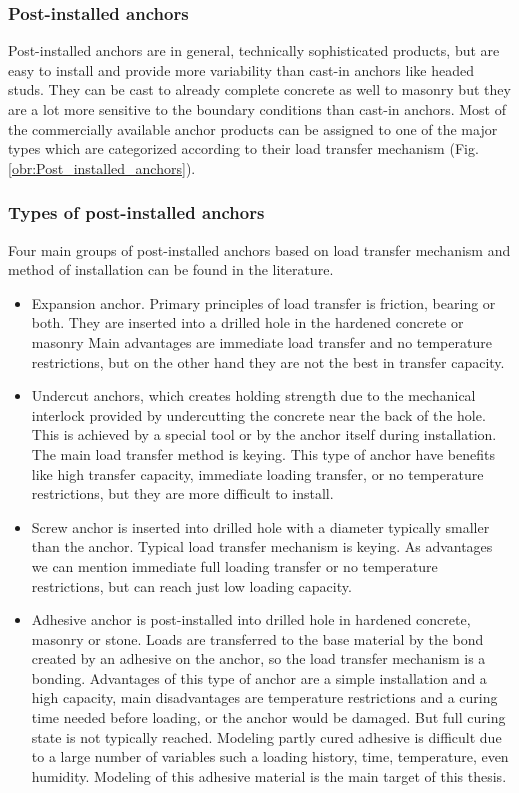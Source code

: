 \subsubsection{Post-installed anchors}
Post-installed anchors are in general, technically sophisticated products, but are easy to install and provide more variability than cast-in anchors like headed studs. They can be cast to already complete concrete as well to masonry but they are a lot more sensitive to the boundary conditions than cast-in anchors. Most of the commercially available anchor products can be assigned to one of the major types which are categorized according to their load transfer mechanism (Fig. \ref{obr:Post_installed_anchors}).


\subsubsection{Types of post-installed anchors}
Four main groups of post-installed anchors based on load transfer mechanism and method of installation can be found in the literature.
 
	\begin{itemize}

	\item Expansion anchor. Primary principles of load transfer is friction, bearing or both. They are inserted into a drilled hole in the hardened concrete or masonry Main advantages are immediate load transfer and no temperature restrictions, but on the other hand they are not the best in transfer capacity. 

	\item Undercut anchors, which creates holding strength due to the mechanical interlock provided by undercutting the concrete near the back of the hole. This is achieved by a special tool or by the anchor itself during installation. The main load transfer method is keying. This type of anchor have benefits like high transfer capacity, immediate loading transfer, or no temperature restrictions, but they are more difficult to install. 

	\item Screw anchor is inserted into drilled hole with a diameter typically smaller than the anchor. Typical load transfer mechanism is keying. As advantages we can mention immediate full loading transfer or no temperature restrictions, but can reach just low loading capacity.

	\item Adhesive anchor is post-installed into drilled hole in hardened concrete, masonry or stone. Loads are transferred to the base material by the bond created by an adhesive on the anchor, so the load transfer mechanism is a bonding. Advantages of this type of anchor are a simple installation and a high capacity, main disadvantages are temperature restrictions and a curing time needed before loading, or the anchor would be damaged. But full curing state is not typically reached. Modeling partly cured adhesive is difficult due to a large number of variables such a loading history, time, temperature, even humidity. Modeling of this adhesive material is the main target of this thesis.
\end{itemize} 

